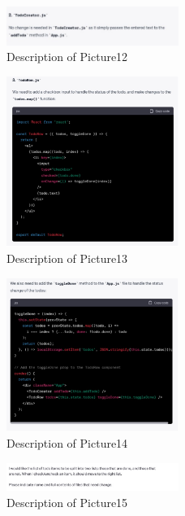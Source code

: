 \documentclass[runningheads]{llncs}
\begin{document}
\begin{figure}[h]
    \centering
    \includegraphics[width=0.5\textwidth]{Pictures/Picture12.jpg}
    \caption{Description of Picture12}
    \label{fig:picture12}
\end{figure}
\begin{figure}[h]
    \centering
    \includegraphics[width=0.5\textwidth]{Pictures/Picture13.jpg}
    \caption{Description of Picture13}
    \label{fig:picture13}
\end{figure}
\begin{figure}[h]
    \centering
    \includegraphics[width=0.5\textwidth]{Pictures/Picture14.jpg}
    \caption{Description of Picture14}
    \label{fig:picture14}
\end{figure}
\begin{figure}[h]
    \centering
    \includegraphics[width=0.5\textwidth]{Pictures/Picture15.jpg}
    \caption{Description of Picture15}
    \label{fig:picture15}
\end{figure}
\end{document}
